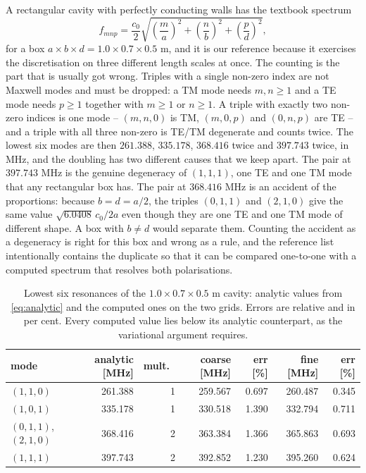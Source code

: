 A rectangular cavity with perfectly conducting walls has the textbook spectrum
\begin{equation}
  f_{mnp} = \frac{c_0}{2}\sqrt{\left(\frac{m}{a}\right)^{2}+\left(\frac{n}{b}\right)^{2}
  +\left(\frac{p}{d}\right)^{2}},
  \label{eq:analytic}
\end{equation}
for a box $a\times b\times d=1.0\times0.7\times0.5$ m, and it is our reference because it exercises
the
discretisation on three different length scales at once. The counting is the part that is usually
got wrong.
Triples with a single non-zero index are not Maxwell modes and must be dropped: a TM mode needs
$m,n\ge1$ and a
TE mode needs $p\ge1$ together with $m\ge1$ or $n\ge1$. A triple with exactly two non-zero indices
is one mode --
$(m,n,0)$ is TM, $(m,0,p)$ and $(0,n,p)$ are TE -- and a triple with all three non-zero is TE/TM
degenerate and
counts twice. The lowest six modes are then $261.388$, $335.178$, $368.416$ twice and $397.743$
twice, in MHz, and
the doubling has two different causes that we keep apart. The pair at $397.743$ MHz is the genuine
degeneracy of
$(1,1,1)$, one TE and one TM mode that any rectangular box has. The pair at $368.416$ MHz is an
accident of the
proportions: because $b=d=a/2$, the triples $(0,1,1)$ and $(2,1,0)$ give the same value
$\sqrt{6.0408}\,c_0/2a$ even though they are one TE and one TM mode of different shape. A box with
$b\neq d$
would separate them. Counting the accident as a degeneracy is right for this box and wrong as a
rule, and the
reference list intentionally contains the duplicate so that it can be compared one-to-one with a
computed
spectrum that resolves both polarisations.

\begin{table}[H]
  \centering
  \caption{Lowest six resonances of the $1.0\times0.7\times0.5$ m cavity: analytic values from
\eqref{eq:analytic}
  and the computed ones on the two grids. Errors are relative and in per cent. Every computed value
lies below
  its analytic counterpart, as the variational argument requires.}
  \label{tab:cavity}
  \begin{tabular}{@{}lrrrrrr@{}}
    \toprule
    mode & analytic [MHz] & mult.\ & coarse [MHz] & err [\%] & fine [MHz] & err [\%] \\
    \midrule
    $(1,1,0)$          & 261.388 & 1 & 259.567 & 0.697 & 260.487 & 0.345 \\
    $(1,0,1)$          & 335.178 & 1 & 330.518 & 1.390 & 332.794 & 0.711 \\
    $(0,1,1)$, $(2,1,0)$ & 368.416 & 2 & 363.384 & 1.366 & 365.863 & 0.693 \\
    $(1,1,1)$          & 397.743 & 2 & 392.852 & 1.230 & 395.260 & 0.624 \\
    \bottomrule
  \end{tabular}
\end{table}

